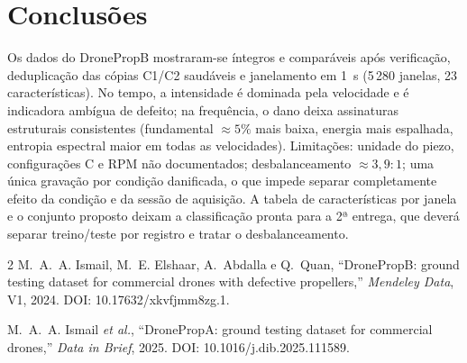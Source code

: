 \documentclass[conference]{IEEEtran}
\begin{document}
\section{Conclusões}
Os dados do DronePropB mostraram-se íntegros e comparáveis após verificação, deduplicação das cópias C1/C2 saudáveis e janelamento em 1~s (5\,280 janelas, 23 características). No tempo, a intensidade é dominada pela velocidade e é indicadora ambígua de defeito; na frequência, o dano deixa assinaturas estruturais consistentes (fundamental $\approx 5\%$ mais baixa, energia mais espalhada, entropia espectral maior em todas as velocidades). Limitações: unidade do piezo, configurações C e RPM não documentados; desbalanceamento $\approx 3{,}9{:}1$; uma única gravação por condição danificada, o que impede separar completamente efeito da condição e da sessão de aquisição. A tabela de características por janela e o conjunto proposto deixam a classificação pronta para a 2ª entrega, que deverá separar treino/teste por registro e tratar o desbalanceamento.

\balance
\begin{thebibliography}{2}
M.~A.~A. Ismail, M.~E. Elshaar, A.~Abdalla e Q.~Quan, ``DronePropB: ground testing dataset for commercial drones with defective propellers,'' \emph{Mendeley Data}, V1, 2024. DOI: 10.17632/xkvfjmm8zg.1.

M.~A.~A. Ismail \emph{et al.}, ``DronePropA: ground testing dataset for commercial drones,'' \emph{Data in Brief}, 2025. DOI: 10.1016/j.dib.2025.111589.
\end{thebibliography}
\end{document}
